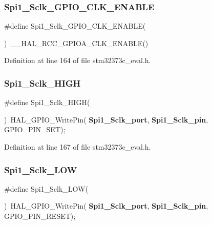 \mbox{\label{group___l_e_d_gab651322d6b7d404df13d1c90e9523a72}} 
\subsubsection{Spi1\+\_\+\+Sclk\+\_\+\+G\+P\+I\+O\+\_\+\+C\+L\+K\+\_\+\+E\+N\+A\+B\+LE}
{\footnotesize\ttfamily \#define Spi1\+\_\+\+Sclk\+\_\+\+G\+P\+I\+O\+\_\+\+C\+L\+K\+\_\+\+E\+N\+A\+B\+LE(\begin{DoxyParamCaption}{ }\end{DoxyParamCaption})~\+\_\+\+\_\+\+H\+A\+L\+\_\+\+R\+C\+C\+\_\+\+G\+P\+I\+O\+A\+\_\+\+C\+L\+K\+\_\+\+E\+N\+A\+B\+LE()}



Definition at line 164 of file stm32373c\+\_\+eval.\+h.

\mbox{\label{group___l_e_d_ga8d86f4ba384d4916ad3d807e58f80258}} 
\subsubsection{Spi1\+\_\+\+Sclk\+\_\+\+H\+I\+GH}
{\footnotesize\ttfamily \#define Spi1\+\_\+\+Sclk\+\_\+\+H\+I\+GH(\begin{DoxyParamCaption}{ }\end{DoxyParamCaption})~H\+A\+L\+\_\+\+G\+P\+I\+O\+\_\+\+Write\+Pin(\textbf{ Spi1\+\_\+\+Sclk\+\_\+port},\textbf{ Spi1\+\_\+\+Sclk\+\_\+pin}, G\+P\+I\+O\+\_\+\+P\+I\+N\+\_\+\+S\+ET);}



Definition at line 167 of file stm32373c\+\_\+eval.\+h.

\mbox{\label{group___l_e_d_gabf1d3341403533d0a4494acfc184eed3}} 
\subsubsection{Spi1\+\_\+\+Sclk\+\_\+\+L\+OW}
{\footnotesize\ttfamily \#define Spi1\+\_\+\+Sclk\+\_\+\+L\+OW(\begin{DoxyParamCaption}{ }\end{DoxyParamCaption})~H\+A\+L\+\_\+\+G\+P\+I\+O\+\_\+\+Write\+Pin(\textbf{ Spi1\+\_\+\+Sclk\+\_\+port},\textbf{ Spi1\+\_\+\+Sclk\+\_\+pin}, G\+P\+I\+O\+\_\+\+P\+I\+N\+\_\+\+R\+E\+S\+ET);}



